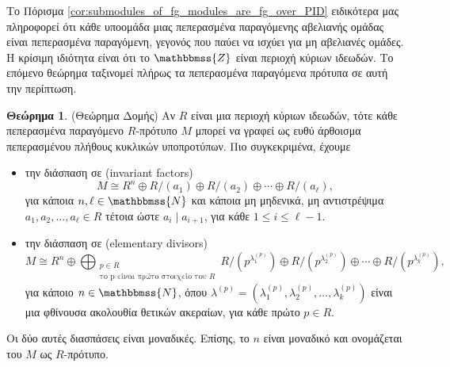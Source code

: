 \documentclass[12pt,a4paper,reqno]{amsart}
\theoremstyle{definition}
\newtheorem{theorem}{Θεώρημα}
\theoremstyle{remark}
\numberwithin{theorem}{section}
\numberwithin{exercise}{section}
\numberwithin{equation}{section}
\newcommand{\NN}{\mathbbmss{N}}
\newcommand{\ZZ}{\mathbbmss{Z}}
\newcommand{\defn}[1]{{\color{mylightblue}{#1}}}
\begin{document}
Το Πόρισμα \ref{cor:submodules_of_fg_modules_are_fg_over_PID} ειδικότερα μας πληροφορεί ότι κάθε υποομάδα μιας πεπερασμένα παραγόμενης αβελιανής ομάδας είναι πεπερασμένα παραγόμενη, γεγονός που παύει να ισχύει για μη αβελιανές ομάδες. Η κρίσιμη ιδιότητα είναι ότι το $\ZZ$ είναι περιοχή κύριων ιδεωδών. Το επόμενο θεώρημα ταξινομεί πλήρως τα πεπερασμένα παραγόμενα πρότυπα σε αυτή την περίπτωση.

\begin{theorem}{\rm(Θεώρημα Δομής)}
    \label{thm:structure}
    Αν $R$ είναι μια περιοχή κύριων ιδεωδών, τότε κάθε πεπερα\-σμένα παραγόμενο $R$-πρότυπο $M$ μπορεί να γραφεί ως ευθύ άρθοισμα πεπερασμένου πλή\-θους κυκλικών υποπροτύπων. Πιο συγκεκριμένα, έχουμε 
    \begin{itemize}
        \item την διάσπαση σε \defn{αναλλοίωτους παράγοντες} (invariant factors)
        \begin{equation}
            \label{eq:invariant_factors}
            M \cong R^n \oplus R/(a_1) \oplus R/(a_2) \oplus \cdots \oplus R/(a_\ell),
        \end{equation}
        για κάποια $n, \ell \in \NN$ και κάποια μη μηδενικά, μη αντιστρέψιμα $a_1, a_2, \dots, a_\ell \in R$ τέτοια ώστε $a_i \mid a_{i+1}$, για κάθε $1 \le i \le \ell-1$.
        \item την διάσπαση σε \defn{στοιχειώδεις διαιρέτες} (elementary divisors)
        \begin{equation}
            \label{eq:elementary_divisors}
            M \cong R^n \oplus \bigoplus_{\substack{p \in R \\ \text{το p είναι πρώτο στοιχείο του $R$}}} R/(p^{\lambda_1^{(p)}}) \oplus R/(p^{\lambda_2^{(p)}}) \oplus \cdots \oplus R/(p^{\lambda_k^{(p)}}),
        \end{equation}
        για κάποιο $n \in \NN$, όπου $\lambda^{(p)} = (\lambda_1^{(p)}, \lambda_2^{(p)}, \dots, \lambda_k^{(p)})$ είναι μια φθίνουσα ακολουθία θετικών ακεραίων, για κάθε πρώτο $p \in R$.
    \end{itemize}
    Οι δύο αυτές διασπάσεις είναι μοναδικές. Επίσης, το $n$ είναι μοναδικό και ονομάζεται \defn{τάξη} του $M$ ως $R$-πρότυπο.
\end{theorem}
\end{document}
